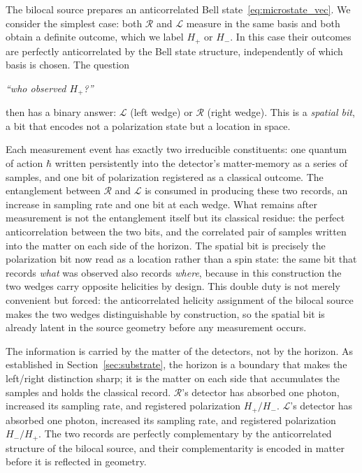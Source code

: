 \documentclass[12pt,a4paper]{article}
\begin{document}
The bilocal source prepares an anticorrelated Bell 
state~\eqref{eq:microstate_vec}. We consider the simplest 
case: both $\mathcal{R}$ and $\mathcal{L}$ measure in the 
same basis and both obtain a definite outcome, which we 
label $H_+$ or $H_-$. In this case their outcomes are 
perfectly anticorrelated by the Bell state structure, 
independently of which basis is chosen. The question

\begin{center}
\textit{``who observed $H_+$?''}
\end{center}
then has a binary answer: 
$\mathcal{L}$ (left wedge) or $\mathcal{R}$ (right wedge). 
This is a \emph{spatial bit}, a bit that encodes not a 
polarization state but a location in space.

Each measurement event has exactly two
irreducible constituents: one quantum of action $\hbar$ written persistently into the
detector's matter-memory as a series of samples, and one bit of polarization registered as a classical
outcome. The entanglement between $\mathcal{R}$ and $\mathcal{L}$ is consumed in producing these two
records, an increase in sampling rate and one bit at each wedge.
What remains after measurement is not the entanglement itself 
but its classical residue: the perfect anticorrelation between
the two bits, and the correlated pair of samples written into the matter on each side of the
horizon. The spatial bit is precisely the polarization bit 
now read as a location rather than a spin state: the same bit that records \emph{what} was
observed also records \emph{where}, because in this construction the two wedges carry
opposite helicities by design. This double duty is not merely convenient but forced: the 
anticorrelated helicity assignment of the bilocal source makes 
the two wedges distinguishable by construction, so the spatial 
bit is already latent in the source geometry before any 
measurement occurs.

The information is carried by the matter of the detectors, not by the horizon. As
established in Section~\ref{sec:substrate}, the horizon is a boundary that makes the
left/right distinction sharp; it is the matter on each side that accumulates the samples and
holds the classical record. $\mathcal{R}$'s detector has absorbed one photon, increased its sampling rate, and registered polarization $H_+/H_-$. $\mathcal{L}$'s detector has absorbed one photon, increased its sampling rate, and registered polarization $H_-/H_+$. The two records are perfectly complementary by the anticorrelated structure of the bilocal source, and their complementarity is encoded in matter before it
is reflected in geometry.
\end{document}
